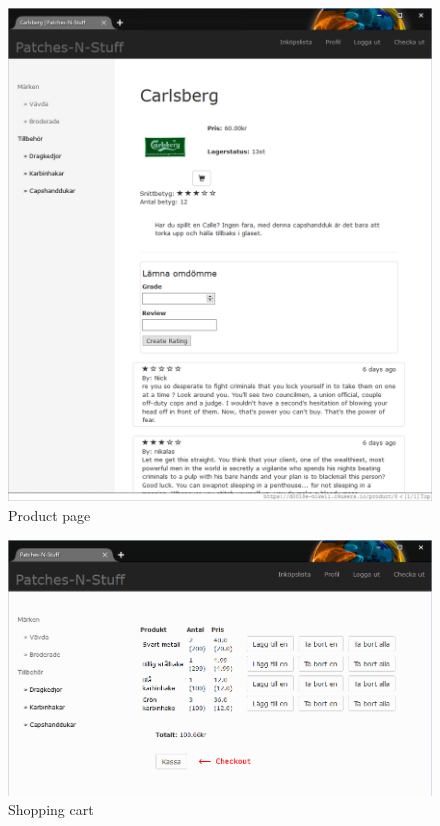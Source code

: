 \documentclass[paper=a4, fontsize=11pt]{report} %
\begin{document}
\begin{figure}
	\includegraphics[width=0.9\paperwidth]{artifacts/stories/8_product.png}
	\caption{Product page}
	\label{fig:product}
\end{figure}

\begin{figure}
	\includegraphics[width=0.9\paperwidth]{artifacts/stories/9_cart.png}
	\caption{Shopping cart}
	\label{fig:cart}
\end{figure}
\end{document}
